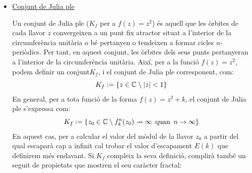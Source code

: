 \documentclass[12pt]{report}
\begin{document}
\begin{itemize}
   \item \underline{Conjunt de Julia ple}
    

   Un conjunt de Julia ple ($K_f$ per a $f(z)=z^2$) és aquell que les òrbites de cada llavor $z$ convergeixen a un punt fix atractor situat a l'interior de la circumferència unitària o bé pertanyen o tendeixen a formar cicles $n$-periòdics.
    \newline
   Per tant, en aquest conjunt, les òrbites dels seus punts pertanyeran a l'interior de la circumferència unitària. Així, per a la funció $f(z)=z^2$, podem definir un conjunt$K_f$, i el conjunt de Julia ple corresponent, com:
    $$K_f:=\{z \in  \mathbb{C} \hspace{0.25em} \backslash \hspace{0.25em} |z| <1\}$$
    En general, per a tota funció de la forma $f(z)=z^2+k$, el conjunt de Julia ple s'expressa com:
    $$K_f := \{ z_0 \in \mathbb{C} \hspace{0.25em} \backslash \hspace{0.25em} f^n_k(z_0) \nrightarrow \infty \hspace{0.5em} \text{quan} \hspace{0.5em} n \rightarrow \infty \}$$
    En aquest cas, per a calcular el valor del mòdul de la llavor $z_0$ a partir del qual escaparà cap a infinit cal trobar el valor d'escapament $E(k)$ que definirem més endavant.
    \newline
    Si $K_f$ compleix la seva definició, complirà també un seguit de propietats que mostren el seu caràcter fractal:
\end{itemize}
   
\end{document}
